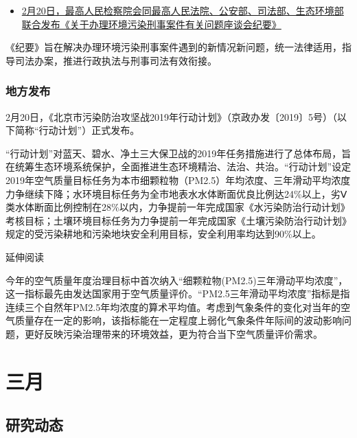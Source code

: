 \documentclass[
]{book}
\providecommand{\tightlist}{%
  \setlength{\itemsep}{0pt}\setlength{\parskip}{0pt}}
\begin{document}
\begin{itemize}
\tightlist
\item
  \href{http://www.spp.gov.cn/spp/zdgz/201902/t20190220_408574.shtml}{2月20日，最高人民检察院会同最高人民法院、公安部、司法部、生态环境部联合发布《关于办理环境污染刑事案件有关问题座谈会纪要》}
\end{itemize}

《纪要》旨在解决办理环境污染刑事案件遇到的新情况新问题，统一法律适用，指导司法办案，推进行政执法与刑事司法有效衔接。

\hypertarget{ux5730ux65b9ux53d1ux5e03}{%
\subsubsection*{地方发布}\label{ux5730ux65b9ux53d1ux5e03}}

2月20日，《北京市污染防治攻坚战2019年行动计划》（京政办发〔2019〕5号）（以下简称``行动计划''）正式发布。

``行动计划''对蓝天、碧水、净土三大保卫战的2019年任务措施进行了总体布局，旨在统筹生态环境系统保护，全面推进生态环境精治、法治、共治。``行动计划''设定2019年空气质量目标任务为本市细颗粒物（PM2.5）年均浓度、三年滑动平均浓度力争继续下降；水环境目标任务为全市地表水水体断面优良比例达24\%以上，劣Ⅴ类水体断面比例控制在28\%以内，力争提前一年完成国家《水污染防治行动计划》考核目标；土壤环境目标任务为力争提前一年完成国家《土壤污染防治行动计划》规定的受污染耕地和污染地块安全利用目标，安全利用率均达到90\%以上。

延伸阅读

今年的空气质量年度治理目标中首次纳入``细颗粒物(PM2.5)三年滑动平均浓度''，这一指标最先由发达国家用于空气质量评价。``PM2.5三年滑动平均浓度''指标是指连续三个自然年PM2.5年均浓度的算术平均值。考虑到气象条件的变化对当年的空气质量存在一定的影响，该指标能在一定程度上弱化气象条件年际间的波动影响问题，更好反映污染治理带来的环境效益，更为符合当下空气质量评价需求。

\hypertarget{ux4e09ux6708-1}{%
\section*{三月}\label{ux4e09ux6708-1}}

\hypertarget{ux7814ux7a76ux52a8ux6001-16}{%
\subsection*{研究动态}\label{ux7814ux7a76ux52a8ux6001-16}}
\end{document}
